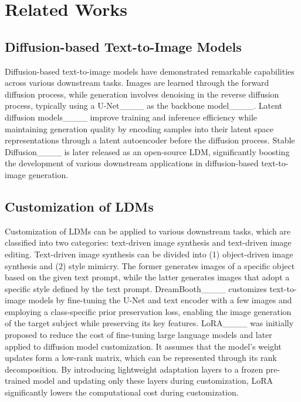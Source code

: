 \section{Related Works}
\subsection{Diffusion-based Text-to-Image Models}
Diffusion-based text-to-image models have demonstrated remarkable capabilities across various downstream tasks. 
Images are learned through the forward diffusion process, while generation involves denoising in the reverse diffusion process, typically using a U-Net____ as the backbone model____.
Latent diffusion models____ improve training and inference efficiency while maintaining generation quality by encoding samples into their latent space representations through a latent autoencoder before the diffusion process.
Stable Diffusion____ is later released as an open-source LDM, significantly boosting the development of various downstream applications in diffusion-based text-to-image generation.


\subsection{Customization of LDMs}
Customization of LDMs can be applied to various downstream tasks, which are classified into two categories: text-driven image synthesis and text-driven image editing.  
Text-driven image synthesis can be divided into (1) object-driven image synthesis and (2) style mimicry. 
The former generates images of a specific object based on the given text prompt, while the latter generates images that adopt a specific style defined by the text prompt.
DreamBooth____ customizes text-to-image models by fine-tuning the U-Net and text encoder with a few images and employing a class-specific prior preservation loss, enabling the image generation of the target subject while preserving its key features.
LoRA____ was initially proposed to reduce the cost of fine-tuning large language models and later applied to diffusion model customization. 
It assumes that the model's weight updates form a low-rank matrix, which can be represented through its rank decomposition. 
By introducing lightweight adaptation layers to a frozen pre-trained model and updating only these layers during customization, LoRA significantly lowers the computational cost during customization.


